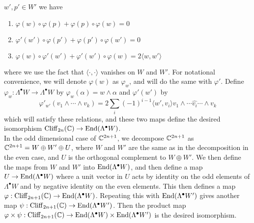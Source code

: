 $w',p' \in W'$ we have
%
\begin{enumerate}
  \item $\varphi(w) \circ \varphi(p) + \varphi(p) \circ \varphi(w) = 0$
  \item $\varphi'(w') \circ \varphi(p') + \varphi(p') \circ \varphi(w') = 0$
  \item $\varphi(w) \circ \varphi'(w') + \varphi'(w') \circ \varphi(w) =
  2\langle w,w' \rangle$
\end{enumerate}
where we use the fact that $\langle \cdot,\cdot \rangle$ vanishes on $W$ and
$W'$. For notational convenience, we will denote $\varphi(w)$ as $\varphi_w$, and
will do the same with $\varphi'$. Define
$\varphi_w : \Lambda^\bullet W \to \Lambda^\bullet W$ by
$\varphi_w(\alpha) = w \wedge \alpha$ and $\varphi'(w')$ by
\[
\varphi'_{w'}(v_1 \wedge \cdots \wedge v_k) = 2\sum_i(-1)^{i-1}\langle w',v_i\rangle
v_1 \wedge \cdots \widehat{v_i} \cdots \wedge v_k
\]
which will satisfy these relations, and these two maps define the desired
isomorphism $\operatorname{Cliff}_{2n}(\mathbb{C}) \to \operatorname{End}(\Lambda^\bullet W)$. \\

In the odd dimensional case of $\mathbb{C}^{2n + 1}$, we decompose $\mathbb{C}^{2n + 1}$ as
$\mathbb{C}^{2n + 1} = W \oplus W' \oplus U$, where $W$ and $W'$ are the same as in the
decomposition in the even case, and $U$ is the orthogonal complement to
$W \oplus W'$. We then define the maps from $W$ and $W'$ into
$\operatorname{End}(\Lambda^\bullet W)$, and then define a map $U \to \operatorname{End}(\Lambda^\bullet W)$
where a unit vector in $U$ acts by identity on the odd elements of $\Lambda^\bullet W$
and by negative identity on the even elements. This then defines a map
$\varphi : \operatorname{Cliff}_{2n + 1}(\mathbb{C}) \to \operatorname{End}(\Lambda^\bullet W)$. Repeating this with
$\operatorname{End}(\Lambda^\bullet W')$ gives another map
$\psi : \operatorname{Cliff}_{2n+1}(\mathbb{C}) \to \operatorname{End}(\Lambda^\bullet W')$. Then the product map
$\varphi \times \psi : \operatorname{Cliff}_{2n+1}(\mathbb{C}) \to \operatorname{End}(\Lambda^\bullet W) \times
\operatorname{End}(\Lambda^\bullet W')$ is the desired isomorphism. \\




\iffalse
We then claim that these two maps satisfy the relations specified above. From
the skew symmetry of the wedge product,
$\varphi(w) \circ \varphi(p) + \varphi(p) \circ \varphi(w) = 0$. For
the second relation, we compute
%
\begin{align*}
&\varphi'(w') \circ \varphi(p')  =
2\sum_i (-1)^{i-1} \langle p',v_i\rangle\varphi'_{w'}(v_1 \wedge \cdots
\widehat{v_i} \cdots \wedge v_k) \\
= 2 \sum_i (-1)^{i-1} \langle p',v_i \rangle &\left( \left(2\sum_{j < i}(-1)^{j-1}
\langle w',v_j\rangle v_1 \wedge \cdots \widehat{v_j} \cdots \widehat{v_i}
\cdots \wedge v_k \right) + \left( 2\sum_{j > i} (-1)^{j} \langle w',v_j\rangle
v_1 \wedge \cdots \widehat{v_i} \cdots \widehat{v_j} \cdots \wedge v_k\right)\right)
\end{align*}
%
computing $\varphi'(p') \circ \varphi'(w')$ then gives a similar result,
with the roles of $p'$ and $w'$ reversed, which gives the same result with a
reversed sign.
\fi
